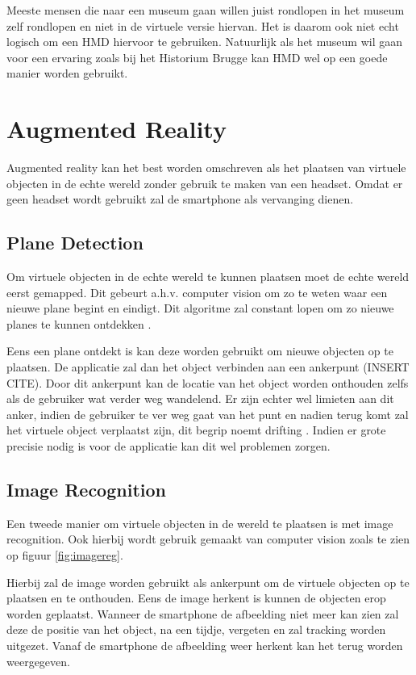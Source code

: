 Meeste mensen die naar een museum gaan willen juist rondlopen in het museum zelf rondlopen en niet in de virtuele versie hiervan. Het is daarom ook niet echt logisch om een HMD hiervoor te gebruiken. Natuurlijk als het museum wil gaan voor een ervaring zoals bij het Historium Brugge kan HMD wel op een goede manier worden gebruikt.

\section{Augmented Reality} \label{sec:augmentedreality}
Augmented reality kan het best worden omschreven als het plaatsen van virtuele objecten in de echte wereld zonder gebruik te maken van een headset. Omdat er geen headset wordt gebruikt zal de smartphone als vervanging dienen.
\subsection{Plane Detection}
Om virtuele objecten in de echte wereld te kunnen plaatsen moet de echte wereld eerst gemapped. Dit gebeurt a.h.v. computer vision om zo te weten waar een nieuwe plane begint en eindigt. Dit algoritme zal constant lopen om zo nieuwe planes te kunnen ontdekken \autocite{Xu2018}. 

Eens een plane ontdekt is kan deze worden gebruikt om nieuwe objecten op te plaatsen. De applicatie zal dan het object verbinden aan een ankerpunt (INSERT CITE). Door dit ankerpunt kan de locatie van het object worden onthouden zelfs als de gebruiker wat verder weg wandelend. Er zijn echter wel limieten aan dit anker, indien de gebruiker te ver weg gaat van het punt en nadien terug komt zal het virtuele object verplaatst zijn, dit begrip noemt drifting \autocite{You1999}. Indien er grote precisie nodig is voor de applicatie kan dit wel problemen zorgen.
\subsection{Image Recognition}
Een tweede manier om virtuele objecten in de wereld te plaatsen is met image recognition. Ook hierbij wordt gebruik gemaakt van computer vision zoals te zien op figuur \ref{fig:imagereg}.

Hierbij zal de image worden gebruikt als ankerpunt om de virtuele objecten op te plaatsen en te onthouden. Eens de image herkent is kunnen de objecten erop worden geplaatst. Wanneer de smartphone de afbeelding niet meer kan zien zal deze de positie van het object, na een tijdje, vergeten en zal tracking worden uitgezet. Vanaf de smartphone de afbeelding weer herkent kan het terug worden weergegeven.

